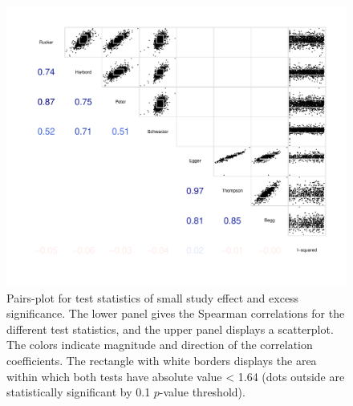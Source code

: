 \documentclass[11pt,a4paper,twoside]{book}\usepackage[]{graphicx}\usepackage[]{color}
\newenvironment{knitrout}{}{} %
\begin{document}
\begin{figure}
\begin{knitrout}
\color{fgcolor}

{\centering \includegraphics[width=\textwidth-3cm]{figure/ch03_figunnamed-chunk-12-1} 

}



\end{knitrout}
\caption{Pairs-plot for test statistics of small study effect and excess significance. The lower panel gives the Spearman correlations for the different test statistics, and the upper panel displays a scatterplot. The colors indicate magnitude and direction of the correlation coefficients. The rectangle with white borders displays the area within which both tests have absolute value < 1.64 (dots outside are statistically significant by 0.1 $p$-value threshold).}
\label{fig:test.agreement}
\end{figure}
\end{document}
